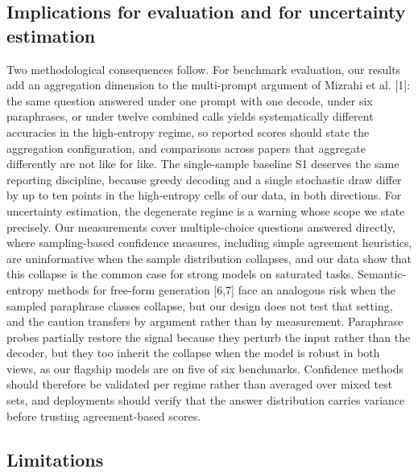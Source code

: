\documentclass[preprint,12pt]{elsarticle}
\begin{document}
\subsection{Implications for evaluation and for uncertainty estimation}

Two methodological consequences follow. For benchmark evaluation, our results add an aggregation dimension to the multi-prompt argument of Mizrahi et al. [1]: the same question answered under one prompt with one decode, under six paraphrases, or under twelve combined calls yields systematically different accuracies in the high-entropy regime, so reported scores should state the aggregation configuration, and comparisons across papers that aggregate differently are not like for like. The single-sample baseline S1 deserves the same reporting discipline, because greedy decoding and a single stochastic draw differ by up to ten points in the high-entropy cells of our data, in both directions. For uncertainty estimation, the degenerate regime is a warning whose scope we state precisely. Our measurements cover multiple-choice questions answered directly, where sampling-based confidence measures, including simple agreement heuristics, are uninformative when the sample distribution collapses, and our data show that this collapse is the common case for strong models on saturated tasks. Semantic-entropy methods for free-form generation [6,7] face an analogous risk when the sampled paraphrase classes collapse, but our design does not test that setting, and the caution transfers by argument rather than by measurement. Paraphrase probes partially restore the signal because they perturb the input rather than the decoder, but they too inherit the collapse when the model is robust in both views, as our flagship models are on five of six benchmarks. Confidence methods should therefore be validated per regime rather than averaged over mixed test sets, and deployments should verify that the answer distribution carries variance before trusting agreement-based scores.

\subsection{Limitations}
\end{document}
